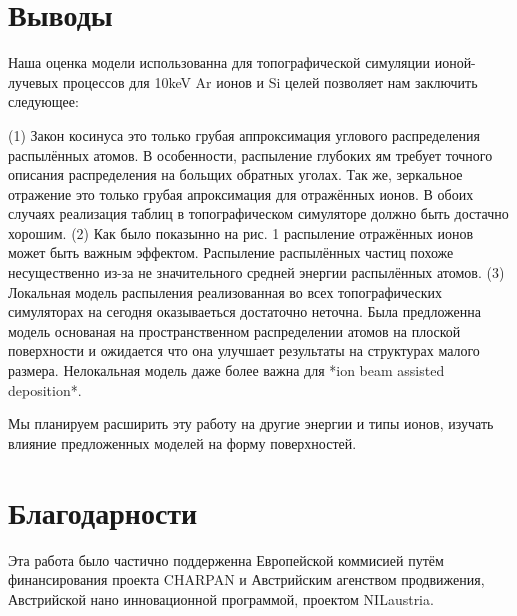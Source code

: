\documentclass[a4paper,fontsize=12pt]{article}
\begin{document}
\section{Выводы}
Наша оценка модели использованна для топографической симуляции ионой-лучевых процессов для 10keV Ar ионов и Si целей позволяет нам заключить следующее:

(1) Закон косинуса это только грубая аппроксимация углового распределения распылённых атомов. В особенности, распыление глубоких ям требует точного описания распределения на больщих обратных уголах. Так же, зеркальное отражение это только грубая апроксимация для отражённых ионов. В обоих случаях реализация таблиц в топографическом симуляторе должно быть достачно хорошим.
(2) Как было показынно на рис. 1 распыление отражённых ионов может быть важным эффектом. Распыление распылённых частиц похоже несущественно из-за не значительного средней энергии распылённых атомов.
(3) Локальная модель распыления реализованная во всех топографических симуляторах на сегодня оказываеться достаточно неточна. Была предложенна модель основаная на пространственном распределении атомов на плоской поверхности и ожидается что она улучшает результаты на структурах малого размера. Нелокальная модель даже более важна для *ion beam assisted deposition*.

Мы планируем расширить эту работу на другие энергии и типы ионов, изучать влияние предложенных моделей на форму поверхностей.

\section{Благодарности}

Эта работа было частично поддерженна Европейской коммисией путём финансирования проекта CHARPAN и Австрийским агенством продвижения, Австрийской нано инновационной программой, проектом NILaustria.
\end{document}
